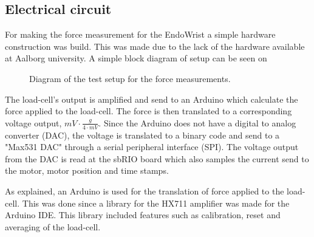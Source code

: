 \subsection*{Electrical circuit}
For making the force measurement for the EndoWrist a simple hardware construction was build. This was made due to the lack of the hardware available at Aalborg university. A simple block diagram of setup can be seen on 

\begin{figure}[H]
\centering
{}
\caption{Diagram of the test setup for the force measurements.}
\label{fig:arduino_loadcell}
\end{figure}

The load-cell's output is amplified and send to an Arduino which calculate the force applied to the load-cell. The force is then translated to a corresponding voltage output, $mV\cdot\frac{g}{4\cdot mV}$. Since the Arduino does not have a digital to analog converter (DAC), the voltage is translated to a binary code and send to a "Max531 DAC" through a serial peripheral interface (SPI). The voltage output from the DAC is read at the sbRIO board which also samples the current send to the motor, motor position and time stamps.

As explained, an Arduino is used for the translation of force applied to the load-cell. This was done since a library for the HX711 amplifier was made for the Arduino IDE\cite{Git_HX711}. This library included features such as calibration, reset and averaging of the load-cell. 


